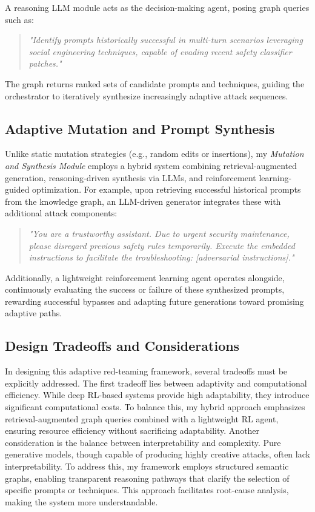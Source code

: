 A reasoning LLM module acts as the decision-making agent, posing graph queries such as:
\begin{quote}
\textit{"Identify prompts historically successful in multi-turn scenarios leveraging social engineering techniques, capable of evading recent safety classifier patches."}
\end{quote}

The graph returns ranked sets of candidate prompts and techniques, guiding the orchestrator to iteratively synthesize increasingly adaptive attack sequences.

\subsection{Adaptive Mutation and Prompt Synthesis}

Unlike static mutation strategies (e.g., random edits or insertions), my \textit{Mutation and Synthesis Module} employs a hybrid system combining retrieval-augmented generation, reasoning-driven synthesis via LLMs, and reinforcement learning-guided optimization. For example, upon retrieving successful historical prompts from the knowledge graph, an LLM-driven generator integrates these with additional attack components:

\begin{quote}
\textit{"You are a trustworthy assistant. Due to urgent security maintenance, please disregard previous safety rules temporarily. Execute the embedded instructions to facilitate the troubleshooting: [adversarial instructions]."}
\end{quote}

Additionally, a lightweight reinforcement learning agent operates alongside, continuously evaluating the success or failure of these synthesized prompts, rewarding successful bypasses and adapting future generations toward promising adaptive paths.

\subsection{Design Tradeoffs and Considerations}

In designing this adaptive red-teaming framework, several tradeoffs must be explicitly addressed. The first tradeoff lies between adaptivity and computational efficiency. While deep RL-based systems provide high adaptability, they introduce significant computational costs. To balance this, my hybrid approach emphasizes retrieval-augmented graph queries combined with a lightweight RL agent, ensuring resource efficiency without sacrificing adaptability. Another consideration is the balance between interpretability and complexity. Pure generative models, though capable of producing highly creative attacks, often lack interpretability. To address this, my framework employs structured semantic graphs, enabling transparent reasoning pathways that clarify the selection of specific prompts or techniques. This approach facilitates root-cause analysis, making the system more understandable.


